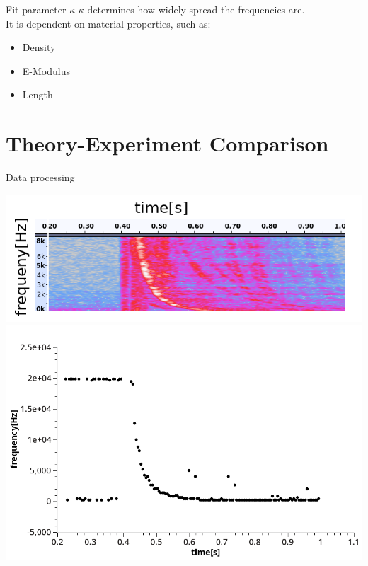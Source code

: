 \documentclass{beamer}
\begin{document}
	\begin{frame}{Fit parameter $\kappa$}
	$\kappa$ determines how widely spread the frequencies are.\\ It is dependent on material properties, such as:
		\begin{itemize}
		\item
		Density
		\item
		E-Modulus
		\item
		Length			
		\end{itemize}
	\end{frame}


\section {Theory-Experiment Comparison}
	\begin{frame}{Data processing}
	\begin{center}
	
		\includegraphics [scale=0.47]{images/axies.png}
		\includegraphics [scale=0.25]{images/converted_csv.png}
	\end{center}

	\end{frame}
\end{document}
